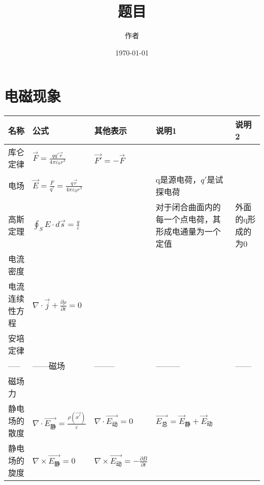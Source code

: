 \documentclass{article}
\title{题目}
\author{作者}
\date{\today}
\begin{document}
\maketitle
\newpage

\renewcommand{\baselinestretch}{1.35}
\tableofcontents
\newpage

\setlength{\parskip}{0em}
\renewcommand{\baselinestretch}{1.93}


\section{电磁现象}

\begin{table}[H]
      \centering
      \begin{tabular}{|m{1.5cm}<{\centering}|m{3.5cm}<{\centering}|m{3cm}<{\centering}|m{4.8cm}<{\centering}|m{1.8cm}<{\centering}|}
      \hline
          名称 & 公式&其他表示 &说明1 &说明2\\ \hline
          库仑定律 &$\displaystyle \vec{F}=\frac{qq'\vec{r}}{4 \pi \varepsilon_0 r^3} $&$ \vec{F'}=-\vec{F} $&&\\ \hline
          电场 &$\displaystyle \vec{E}=\frac{F}{q'}=\frac{q\vec{r}}{4 \pi \varepsilon_0 r^3} $&&q是源电荷，$q'$是试探电荷&\\ \hline
          高斯定理&
          $\displaystyle \oint_{S}E \cdot d \overrightarrow{s}=\frac{q}{\varepsilon}$
          &&对于闭合曲面内的每一个点电荷，其形成电通量为一个定值& 外面的q形成的为0\\ \hline
          电流密度&&&&\\ \hline
          电流连续性方程&
          $\displaystyle \nabla \cdot \vec{j}+\frac{\partial \rho}{\partial t}=0  $
          &&&\\ \hline
          安培定律&&&&\\ \hline
          -----  &------磁场&--------&---------&------
            \\ \hline 
            磁场力&&&&  \\
            \hline
            静电场的散度&$\displaystyle \nabla \cdot \vec{E_{\text{静}}}=\frac{\rho(\vec{x'})}{\varepsilon}$&
            $\displaystyle \nabla \cdot \vec{E_{\text{动}}}=0$
            &$\vec{E_{\text{总}}}={\vec{E}_{\text{静}}+\vec{E}_{\text{动}}}$&\\ \hline
            静电场的旋度&$\displaystyle \nabla \times \vec{E_{\text{静}}}=0$&
            $\displaystyle \nabla \times \vec{E_{\text{动}}}=-\frac{\partial B}{\partial t}  $

\end{tabular}
\end{table}
\end{document}
